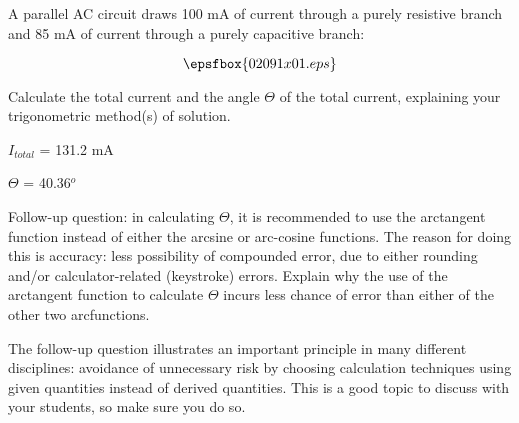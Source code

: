 

A parallel AC circuit draws 100 mA of current through a purely resistive branch and 85 mA of current through a purely capacitive branch:

$$\epsfbox{02091x01.eps}$$

Calculate the total current and the angle $\Theta$ of the total current, explaining your trigonometric method(s) of solution.







$I_{total}$ = 131.2 mA

$\Theta$ = 40.36$^{o}$

\vskip 10pt

Follow-up question: in calculating $\Theta$, it is recommended to use the arctangent function instead of either the arcsine or arc-cosine functions.  The reason for doing this is accuracy: less possibility of compounded error, due to either rounding and/or calculator-related (keystroke) errors.  Explain why the use of the arctangent function to calculate $\Theta$ incurs less chance of error than either of the other two arcfunctions.







The follow-up question illustrates an important principle in many different disciplines: avoidance of unnecessary risk by choosing calculation techniques using given quantities instead of derived quantities.  This is a good topic to discuss with your students, so make sure you do so.




